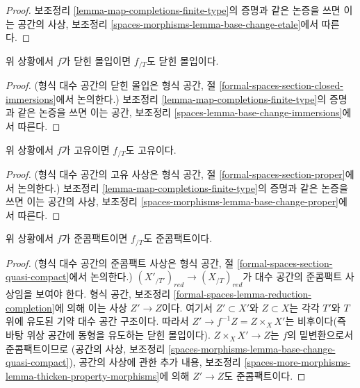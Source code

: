 \begin{proof}
보조정리 \ref{lemma-map-completions-finite-type}의 증명과 같은 논증을
쓰면 이는 공간의 사상, 보조정리
\ref{spaces-morphisms-lemma-base-change-etale}에서 따른다.
\end{proof}

\begin{lemma}
\label{lemma-closed-immersion-gives-closed-immersion}
위 상황에서 $f$가 닫힌 몰입이면 $f_{/T}$도 닫힌 몰입이다.
\end{lemma}

\begin{proof}
(형식 대수 공간의 닫힌 몰입은 형식 공간, 절
\ref{formal-spaces-section-closed-immersions}에서 논의한다.)
보조정리 \ref{lemma-map-completions-finite-type}의 증명과 같은 논증을
쓰면 이는 공간, 보조정리
\ref{spaces-lemma-base-change-immersions}에서 따른다.
\end{proof}

\begin{lemma}
\label{lemma-proper-gives-proper}
위 상황에서 $f$가 고유이면 $f_{/T}$도 고유이다.
\end{lemma}

\begin{proof}
(형식 대수 공간의 고유 사상은 형식 공간, 절
\ref{formal-spaces-section-proper}에서 논의한다.)
보조정리 \ref{lemma-map-completions-finite-type}의 증명과 같은 논증을
쓰면 이는 공간의 사상, 보조정리
\ref{spaces-morphisms-lemma-base-change-proper}에서 따른다.
\end{proof}

\begin{lemma}
\label{lemma-quasi-compact-gives-quasi-compact}
위 상황에서 $f$가 준콤팩트이면 $f_{/T}$도 준콤팩트이다.
\end{lemma}

\begin{proof}
(형식 대수 공간의 준콤팩트 사상은 형식 공간, 절
\ref{formal-spaces-section-quasi-compact}에서 논의한다.)
$(X'_{/T'})_{red} \to (X_{/T})_{red}$가 대수 공간의 준콤팩트 사상임을
보여야 한다. 형식 공간, 보조정리
\ref{formal-spaces-lemma-reduction-completion}에 의해 이는 사상
$Z' \to Z$이다. 여기서 $Z' \subset X'$와 $Z \subset X$는 각각
$T'$와 $T$ 위에 유도된 기약 대수 공간 구조이다.
따라서 $Z' \to f^{-1}Z = Z \times_X X'$는 비후이다(즉 바탕 위상 공간에
동형을 유도하는 닫힌 몰입이다).
$Z \times_X X' \to Z$는 $f$의 밑변환으로서 준콤팩트이므로
(공간의 사상, 보조정리
\ref{spaces-morphisms-lemma-base-change-quasi-compact}),
공간의 사상에 관한 추가 내용, 보조정리
\ref{spaces-more-morphisms-lemma-thicken-property-morphisms}에 의해
$Z' \to Z$도 준콤팩트이다.
\end{proof}

